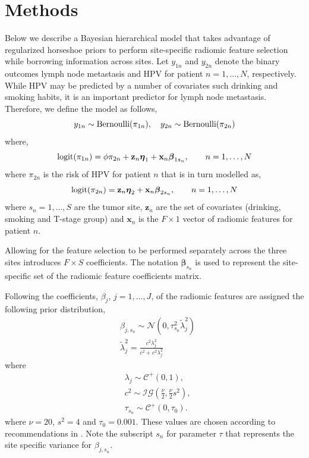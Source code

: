 \documentclass[10pt]{article}
\begin{document}
\section{Methods}

Below we describe a Bayesian hierarchical model that takes advantage of regularized horseshoe priors \cite{PiiVeh2017} to perform site-specific radiomic feature selection while borrowing information across sites.  Let $y_{1n}$ and $y_{2n}$ denote the binary outcomes lymph node metastasis and HPV for patient $n = 1, \ldots, N$, respectively. While HPV may be predicted by a number of covariates such drinking and smoking habits, it is an important predictor for lymph node metastasis. Therefore, we define the model as follows,
\begin{equation}
\label{eqn:model}
y_{1n} \sim \text{Bernoulli}(\pi_{1n}),\hskip 10pt y_{2n} \sim \text{Bernoulli}(\pi_{2n})
\end{equation}
where,
\begin{equation*}
\text{logit}(\mathbf{\pi}_{1n}) = \phi \pi_{2n} + \mathbf{z}_n \boldsymbol{\eta}_1+ \mathbf{x}_n\boldsymbol{\beta}_{1s_n}, \hskip 20pt n = 1, \ldots,N
\end{equation*}
where $\pi_{2n}$ is the risk of HPV for patient $n$ that is in turn modelled as,
\begin{equation*}
\text{logit}(\pi_{2n}) = \mathbf{z}_n \boldsymbol{\eta}_2+ \mathbf{x}_n\boldsymbol{\beta}_{2s_n}, \hskip 20pt n = 1, \ldots,N
\end{equation*}
where $s_n = 1,\ldots, S$ are the tumor site, $ \mathbf{z}_n$ are the set of covariates (drinking, smoking and T-stage group)  and  $\mathbf{x}_n$ is the $F\times 1$ vector of radiomic features for patient $n$.

Allowing for the feature selection to be performed separately across the three sites introduces $F\times S$ coefficients. The notation $\boldsymbol{\beta}_{s_n}$ is used to represent the site-specific set of the radiomic feature coefficients matrix.

Following \cite{PiiVeh2017} the coefficients, $\beta_j$, $j = 1, \ldots, J$, of the radiomic features are assigned the following prior distribution,
\begin{align*}
&\beta_{j,s_n} \sim \mathcal{N}(0, \tau^2_{s_n}\tilde{\lambda}_j^2)\\
& \tilde{\lambda}_j^2 = \frac{c^2\lambda_j^2}{c^2 + c^2\lambda_j^2}
\end{align*}
where 
\begin{align*}
&\lambda_j \sim \mathcal{C}^+(0,1),\\
& c^2\sim \mathcal{IG}(\frac{\nu}{2},\frac{\nu}{2}s^2),\\
& \tau_{s_n} \sim \mathcal{C}^+(0, \tau_0).
\end{align*}
where $\nu = 20$, $s^2 = 4$ and $\tau_0=0.001$. These values are chosen according to recommendations in \cite{PiiVeh2017}. Note the subscript $s_n$ for parameter $\tau$ that represents the site specific variance for $\beta_{j,s_n}$. 
\end{document}
